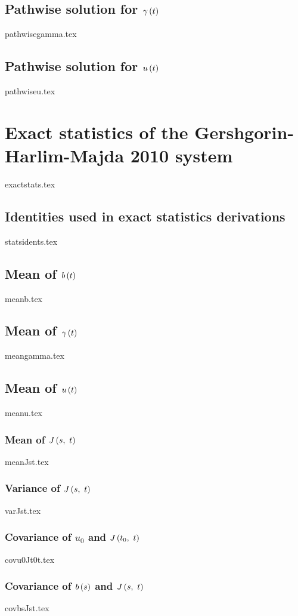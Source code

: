 \documentclass[letterpaper, 12pt]{article}
\begin{document}
		\subsection{Pathwise solution for $\gamma \left( t \right)$}
			{pathwisegamma.tex}
		\subsection{Pathwise solution for $u \left( t \right)$}
			{pathwiseu.tex}
	
	\section{Exact statistics of the Gershgorin-Harlim-Majda 2010 system} \label{app:exact_stats}
		{exactstats.tex}
		\subsection{Identities used in exact statistics derivations}
			{statsidents.tex}
		\subsection{Mean of $b \left( t \right)$}
			{meanb.tex}
		\subsection{Mean of $\gamma \left( t \right)$}
			{meangamma.tex}
		\subsection{Mean of $u \left( t \right)$}
			{meanu.tex}
			\subsubsection{Mean of $J \left( s,\ t \right)$}
				{meanJst.tex}
			\subsubsection{Variance of $J \left( s,\ t \right)$}
				{varJst.tex}
			\subsubsection{Covariance of $u_0$ and $J \left( t_0,\ t \right)$}
				{covu0Jt0t.tex}
			\subsubsection{Covariance of $b \left( s \right)$ and $J \left( s,\ t \right)$}
				{covbsJst.tex}
\end{document}
